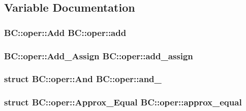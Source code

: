 \subsection{Variable Documentation}
\subsubsection[{\texorpdfstring{add}{add}}]{\setlength{\rightskip}{0pt plus 5cm} {\bf B\+C\+::oper\+::\+Add}  B\+C\+::oper\+::add}\hypertarget{namespaceBC_1_1oper_a9abd1b1482fb204f15035685456462a9}{}\label{namespaceBC_1_1oper_a9abd1b1482fb204f15035685456462a9}
\subsubsection[{\texorpdfstring{add\+\_\+assign}{add_assign}}]{\setlength{\rightskip}{0pt plus 5cm} {\bf B\+C\+::oper\+::\+Add\+\_\+\+Assign}  B\+C\+::oper\+::add\+\_\+assign}\hypertarget{namespaceBC_1_1oper_ab49f6a815bf77c8acda88d438b6c9bd3}{}\label{namespaceBC_1_1oper_ab49f6a815bf77c8acda88d438b6c9bd3}
\subsubsection[{\texorpdfstring{and\+\_\+}{and_}}]{\setlength{\rightskip}{0pt plus 5cm}struct {\bf B\+C\+::oper\+::\+And}  B\+C\+::oper\+::and\+\_\+}\hypertarget{namespaceBC_1_1oper_af41879d72b034200adc95b5c93892b4c}{}\label{namespaceBC_1_1oper_af41879d72b034200adc95b5c93892b4c}
\subsubsection[{\texorpdfstring{approx\+\_\+equal}{approx_equal}}]{\setlength{\rightskip}{0pt plus 5cm}struct {\bf B\+C\+::oper\+::\+Approx\+\_\+\+Equal}  B\+C\+::oper\+::approx\+\_\+equal}\hypertarget{namespaceBC_1_1oper_a2619e251431022a4414ca2d48cb04bd9}{}\label{namespaceBC_1_1oper_a2619e251431022a4414ca2d48cb04bd9}
